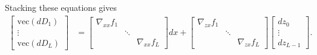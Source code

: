 \documentclass{article}
\begin{document}
Stacking these equations gives
\begin{align}
  \begin{bmatrix}
    \mathrm{vec}\left(dD_1\right) \\
    \vdots                        \\
    \mathrm{vec}\left(dD_L\right)
  \end{bmatrix}
   & =
  \begin{bmatrix}
    \nabla_{xx} f_1 &        &                 \\
                    & \ddots &                 \\
                    &        & \nabla_{xx} f_L
  \end{bmatrix}
  dx
  +
  \begin{bmatrix}
    \nabla_{zx} f_1 &        &                 \\
                    & \ddots &                 \\
                    &        & \nabla_{zx} f_L
  \end{bmatrix}
  \begin{bmatrix}
    dz_0 \\ \vdots \\ dz_{L-1}
  \end{bmatrix}
  .
\end{align}
\end{document}
